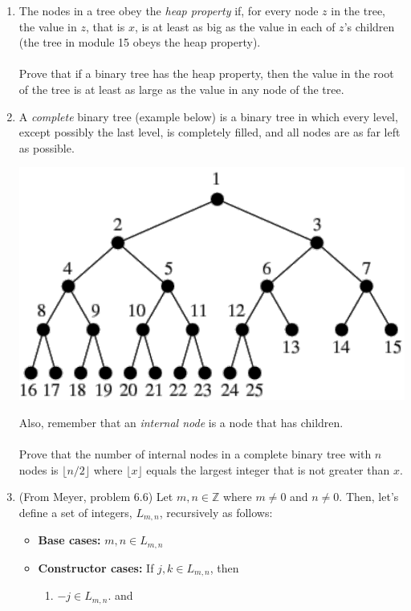 \documentclass[12pt]{article}
\begin{document}
\begin{enumerate}
\item The nodes in a tree obey the \textit{heap property} if, for every node $z$ in the tree, the value in $z$, that is $x$, is at least as big as the value in each of $z$'s children (the tree in module 15 obeys the heap property).\\\\
Prove that if a binary tree has the heap property, then the value in the root of the tree is at least as large as the value in any node of the tree.
\item A \textit{complete} binary tree (example below) is a binary tree in which every level, except possibly the last level, is completely filled, and all nodes are as far left as possible.
\begin{center}
\includegraphics[scale=.3]{CompleteBinaryTree.pdf}
\end{center}
Also, remember that an \textit{internal node} is a node that has children.\\\\
Prove that the number of internal nodes in a complete binary tree with $n$ nodes is $\lfloor n/2 \rfloor$ where $\lfloor x \rfloor$ equals the largest integer that is not greater than $x$.
\item (From Meyer, problem 6.6) Let $m,n \in \mathbb{Z}$ where $m \not = 0$ and $n \not = 0$. Then, let's define a set of integers, $L_{m,n}$, recursively as follows:
\begin{itemize}
\item \textbf{Base cases:} $m,n \in L_{m,n}$
\item \textbf{Constructor cases:} If $j,k \in L_{m,n}$, then
\begin{enumerate}
\item $-j \in L_{m,n}$. and

\end{enumerate}
\end{itemize}
\end{enumerate}
\end{document}
